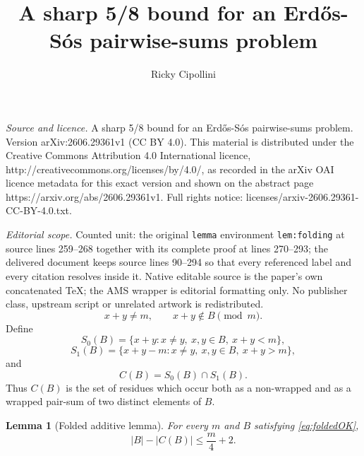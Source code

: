 \documentclass[10pt,a4paper]{amsart}
\newtheorem{lemma}[theorem]{Lemma}
\begin{document}
\title[A sharp 5/8 bound for an ErdHos-S'os pairwise-sums problem]{A sharp 5/8 bound for an Erd\H{o}s-S\'os pairwise-sums problem}
\author{Ricky Cipollini}
\date{}
\maketitle
\noindent\emph{Source and licence.} A sharp 5/8 bound for an Erd\H{o}s-S\'os pairwise-sums problem. Version arXiv:2606.29361v1 (CC BY 4.0). This material is distributed under the Creative Commons Attribution 4.0 International licence, http://creativecommons.org/licenses/by/4.0/, as recorded in the arXiv OAI licence metadata for this exact version and shown on the abstract page https://arxiv.org/abs/2606.29361v1. Full rights notice: licenses/arxiv-2606.29361-CC-BY-4.0.txt.\par\smallskip
\noindent\textit{Editorial scope.} Counted unit: the original \texttt{lemma} environment \texttt{lem:folding} at source lines 259--268 together with its complete proof at lines 270--293; the delivered document keeps source lines 90--294 so that every referenced label and every citation resolves inside it. Native editable source is the paper's own concatenated TeX; the AMS wrapper is editorial formatting only. No publisher class, upstream script or unrelated artwork is redistributed.
\begin{equation}\label{eq:foldedOK}
  x+y\neq m,
  \qquad
  x+y\notin B\pmod m.
\end{equation}
Define
\[
  S_0(B)=\{x+y:x\neq y,\ x,y\in B,\ x+y<m\},
\]
\[
  S_1(B)=\{x+y-m:x\neq y,\ x,y\in B,\ x+y>m\},
\]
and
\[
  C(B)=S_0(B)\cap S_1(B).
\]
Thus $C(B)$ is the set of residues which occur both as a non-wrapped and as a wrapped pair-sum of two distinct elements of $B$.

\begin{lemma}[Folded additive lemma]\label{lem:folded}
For every $m$ and $B$ satisfying \eqref{eq:foldedOK},
\[
  |B|-|C(B)|\leq \frac m4+2.
\]
\end{lemma}
\end{document}

